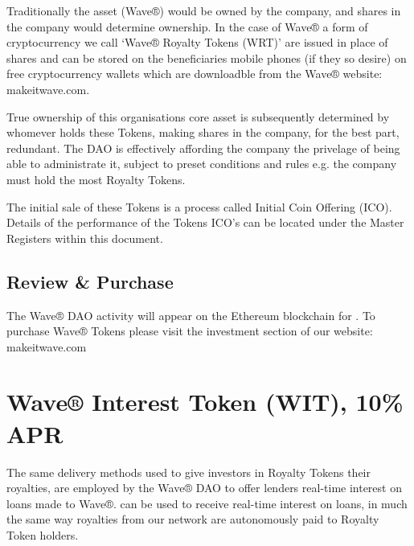 \documentclass[letterpaper,10pt,openany,oneside,english]{sphinxmanual}
\begin{document}
Traditionally the asset (Wave®) would be owned by the company, and shares in the company would determine ownership.
In the case of Wave® a form of cryptocurrency we call ‘Wave® Royalty Tokens (WRT)’ are issued in place of shares and can be stored on the beneficiaries mobile phones (if they so desire) on free cryptocurrency wallets which are downloadble from the Wave®  website: makeitwave.com.

True ownership of this organisations core asset is subsequently determined by whomever holds these Tokens, making shares in the company, for the best part, redundant.
The DAO is effectively affording the company the privelage of being able to administrate it, subject to preset conditions and rules e.g. the company must hold the most Royalty Tokens.

The initial sale of these Tokens is a process called Initial Coin Offering (ICO).
Details of the performance of the Tokens ICO’s can be located under the Master Registers within this document.


\section{Review \& Purchase}
\label{\detokenize{introduction:review-purchase}}
The Wave® DAO activity will appear on the Ethereum blockchain for .
To purchase Wave® Tokens please visit the investment section of our website: makeitwave.com


\chapter{Wave® Interest Token (WIT), 10\% APR}
\label{\detokenize{wit-summary:wave-interest-token-wit-10-apr}}\label{\detokenize{wit-summary::doc}}
The same delivery methods used to give investors in Royalty Tokens their royalties, are employed by the Wave® DAO to offer lenders real-time interest on loans made to Wave®.
 can be used to receive real-time interest on loans, in much the same way royalties from our network are autonomously paid to Royalty Token holders.
\end{document}
